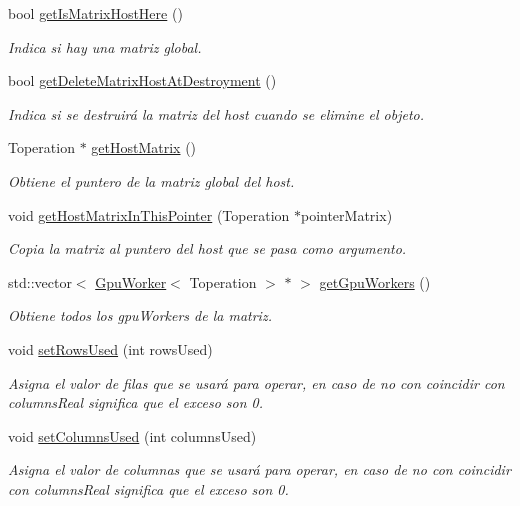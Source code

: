 \begin{DoxyCompactItemize}
bool \hyperlink{classMatrixMain_a6e00fc3ae8e8c9f0f4acafea1c277896}{get\+Is\+Matrix\+Host\+Here} ()
\begin{DoxyCompactList}\small\item\em Indica si hay una matriz global. \end{DoxyCompactList}\item 
bool \hyperlink{classMatrixMain_ada6337937413c1ad5660373ab23b1b40}{get\+Delete\+Matrix\+Host\+At\+Destroyment} ()
\begin{DoxyCompactList}\small\item\em Indica si se destruirá la matriz del host cuando se elimine el objeto. \end{DoxyCompactList}\item 
Toperation $\ast$ \hyperlink{classMatrixMain_a34fdb08ac465293c535168c626ab181d}{get\+Host\+Matrix} ()
\begin{DoxyCompactList}\small\item\em Obtiene el puntero de la matriz global del host. \end{DoxyCompactList}\item 
void \hyperlink{classMatrixMain_ad53a94f43e0c1544a497cb238aaaa364}{get\+Host\+Matrix\+In\+This\+Pointer} (Toperation $\ast$pointer\+Matrix)
\begin{DoxyCompactList}\small\item\em Copia la matriz al puntero del host que se pasa como argumento. \end{DoxyCompactList}\item 
std\+::vector$<$ \hyperlink{classGpuWorker}{Gpu\+Worker}$<$ Toperation $>$ $\ast$ $>$ \hyperlink{classMatrixMain_a627cb55a45b1a2618387483d24878d63}{get\+Gpu\+Workers} ()
\begin{DoxyCompactList}\small\item\em Obtiene todos los gpu\+Workers de la matriz. \end{DoxyCompactList}\item 
void \hyperlink{classMatrixMain_aed24dfbeb31237e66b29e13a66ce2ef2}{set\+Rows\+Used} (int rows\+Used)
\begin{DoxyCompactList}\small\item\em Asigna el valor de filas que se usará para operar, en caso de no con coincidir con columns\+Real significa que el exceso son 0. \end{DoxyCompactList}\item 
void \hyperlink{classMatrixMain_aa85480f53c9b1deea09d5fbed1a48d2e}{set\+Columns\+Used} (int columns\+Used)
\begin{DoxyCompactList}\small\item\em Asigna el valor de columnas que se usará para operar, en caso de no con coincidir con columns\+Real significa que el exceso son 0. \end{DoxyCompactList}\item 

\end{DoxyCompactItemize}
